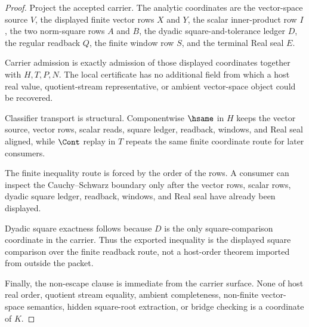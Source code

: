 \begin{proof}
Project the accepted carrier. The analytic coordinates are the vector-space source $V$, the displayed finite vector rows $X$ and $Y$, the scalar inner-product row $I$, the two norm-square rows $A$ and $B$, the dyadic square-and-tolerance ledger $D$, the regular readback $Q$, the finite window row $S$, and the terminal Real seal $E$.

Carrier admission is exactly admission of those displayed coordinates together with $H,T,P,N$. The local certificate has no additional field from which a host real value, quotient-stream representative, or ambient vector-space object could be recovered.

Classifier transport is structural. Componentwise $\hsame$ in $H$ keeps the vector source, vector rows, scalar reads, square ledger, readback, windows, and Real seal aligned, while $\Cont$ replay in $T$ repeats the same finite coordinate route for later consumers.

The finite inequality route is forced by the order of the rows. A consumer can inspect the Cauchy--Schwarz boundary only after the vector rows, scalar rows, dyadic square ledger, readback, windows, and Real seal have already been displayed.

Dyadic square exactness follows because $D$ is the only square-comparison coordinate in the carrier. Thus the exported inequality is the displayed square comparison over the finite readback route, not a host-order theorem imported from outside the packet.

Finally, the non-escape clause is immediate from the carrier surface. None of host real order, quotient stream equality, ambient completeness, non-finite vector-space semantics, hidden square-root extraction, or bridge checking is a coordinate of $K$.
\end{proof}

